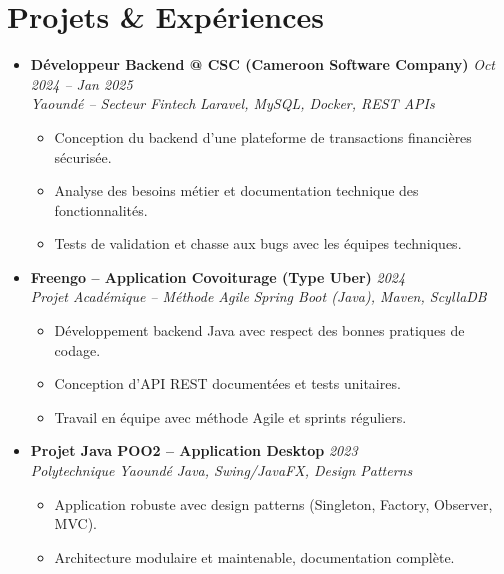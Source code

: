 \documentclass[a4paper,11pt]{article}
\begin{document}
\section{Projets \& Expériences}
\begin{itemize}[leftmargin=*, label={-}]

\item \textbf{Développeur Backend @ CSC (Cameroon Software Company)} \hfill \textit{Oct 2024 -- Jan 2025} \\
\textit{Yaoundé -- Secteur Fintech} \hfill \textit{Laravel, MySQL, Docker, REST APIs}
\vspace{-2pt}
    \begin{itemize}[leftmargin=0.4cm, nosep, label=\tiny$\bullet$]
        \item \small{Conception du backend d'une plateforme de transactions financières sécurisée.}
        \item \small{Analyse des besoins métier et documentation technique des fonctionnalités.}
        \item \small{Tests de validation et chasse aux bugs avec les équipes techniques.}
    \end{itemize}
\vspace{3pt}

\item \textbf{Freengo -- Application Covoiturage (Type Uber)} \hfill \textit{2024} \\
\textit{Projet Académique -- Méthode Agile} \hfill \textit{Spring Boot (Java), Maven, ScyllaDB}
\vspace{-2pt}
    \begin{itemize}[leftmargin=0.4cm, nosep, label=\tiny$\bullet$]
        \item \small{Développement backend Java avec respect des bonnes pratiques de codage.}
        \item \small{Conception d'API REST documentées et tests unitaires.}
        \item \small{Travail en équipe avec méthode Agile et sprints réguliers.}
    \end{itemize}
\vspace{3pt}

\item \textbf{Projet Java POO2 -- Application Desktop} \hfill \textit{2023} \\
\textit{Polytechnique Yaoundé} \hfill \textit{Java, Swing/JavaFX, Design Patterns}
\vspace{-2pt}
    \begin{itemize}[leftmargin=0.4cm, nosep, label=\tiny$\bullet$]
        \item \small{Application robuste avec design patterns (Singleton, Factory, Observer, MVC).}
        \item \small{Architecture modulaire et maintenable, documentation complète.}
    \end{itemize}
\vspace{3pt}


\end{itemize}
\end{document}
